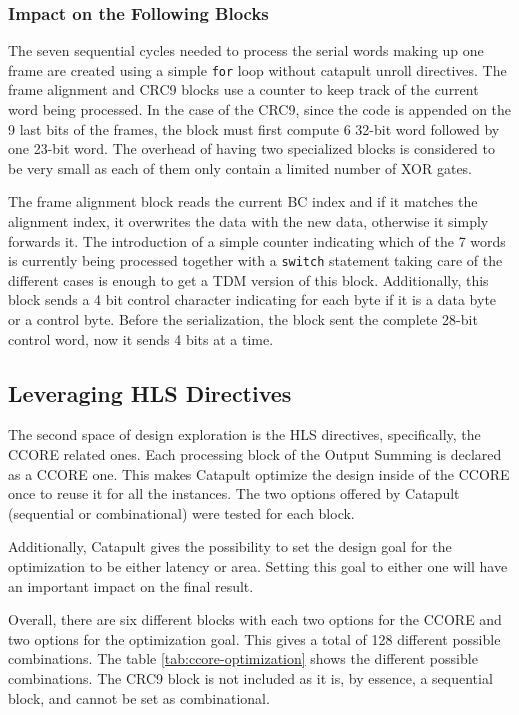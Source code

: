 \subsubsection{Impact on the Following Blocks}

The seven sequential cycles needed to process the serial words making up one frame are created using a simple \verb|for| loop without catapult unroll directives. The frame alignment and CRC9 blocks use a counter to keep track of the current word being processed. In the case of the CRC9, since the code is appended on the 9 last bits of the frames, the block must first compute 6 32-bit word followed by one 23-bit word. The overhead of having two specialized blocks is considered to be very small as each of them only contain a limited number of XOR gates.

The frame alignment block reads the current BC index and if it matches the alignment index, it overwrites the data with the new data, otherwise it simply forwards it. The introduction of a simple counter indicating which of the 7 words is currently being processed together with a \verb|switch| statement taking care of the different cases is enough to get a TDM version of this block. Additionally, this block sends a 4 bit control character indicating for each byte if it is a data byte or a control byte. Before the serialization, the block sent the complete 28-bit control word, now it sends 4 bits at a time.


\subsection{Leveraging HLS Directives}

The second space of design exploration is the HLS directives, specifically, the CCORE related ones. Each processing block of the Output Summing is declared as a CCORE one. This makes Catapult optimize the design inside of the CCORE once to reuse it for all the instances. The two options offered by Catapult (sequential or combinational) were tested for each block.

Additionally, Catapult gives the possibility to set the design goal for the optimization to be either latency or area. Setting this goal to either one will have an important impact on the final result.

Overall, there are six different blocks with each two options for the CCORE and two options for the optimization goal. This gives a total of 128 different possible combinations. The table \ref{tab:ccore-optimization} shows the different possible combinations. The CRC9 block is not included as it is, by essence, a sequential block, and cannot be set as combinational.

